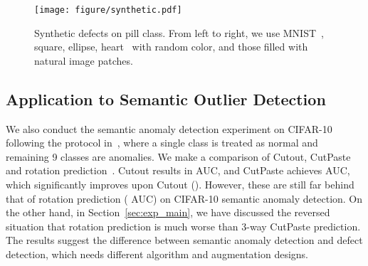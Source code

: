 \documentclass[final]{cvpr}
\begin{document}
\begin{figure}[t]
    \centering
    \texttt{[image: figure/synthetic.pdf]}
    \vspace{-0.2in}
    \caption{Synthetic defects on pill class. From left to right, we use MNIST~\cite{lecun1998gradient}, square, ellipse, heart~\cite{matthey2017dsprites} with random color, and those filled with natural image patches.}
    \label{fig:synthetic_data}
    \vspace{-0.1in}
\end{figure}


\begin{table}[t]
    \centering
    \caption{Detection AUCs on synthetic data. Various shapes, such as digit, square, ellipse, or heart, are patched to normal images with random color or natural images (). }
    \label{tab:exp_synthetic}
    \vspace{-0.1in}
    \vspace{-0.1in}
\end{table}


\subsection{Application to Semantic Outlier Detection}
\label{sec:abl_semantic}
We also conduct the semantic anomaly detection experiment on CIFAR-10~\cite{krizhevsky2009learning} following the protocol in~\cite{golan2018deep,sohn2020learning}, where a single class is treated as normal and remaining 9 classes are anomalies. We make a comparison of Cutout, CutPaste and rotation prediction~\cite{sohn2020learning}. Cutout results in  AUC, and CutPaste achieves  AUC, which significantly improves upon Cutout (). However, these are still far behind that of rotation prediction ( AUC) on CIFAR-10 semantic anomaly detection.
On the other hand, in Section~\ref{sec:exp_main}, we have discussed the reversed situation that rotation prediction is much worse than 3-way CutPaste prediction. 
The results suggest the difference between semantic anomaly detection and defect detection, which needs different algorithm and augmentation designs.
\end{document}
